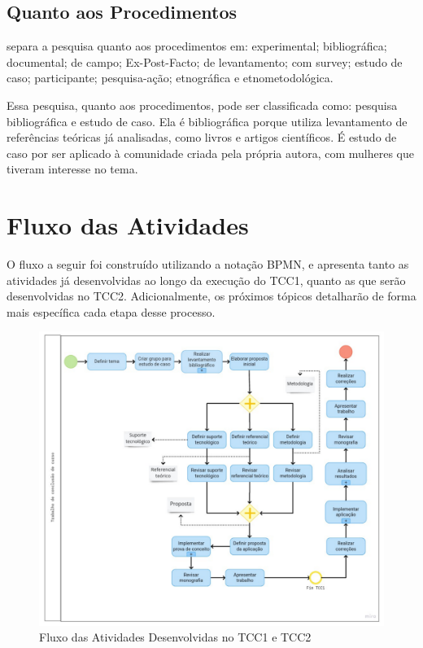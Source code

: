 \subsection{Quanto aos Procedimentos}

 separa a pesquisa quanto aos 
procedimentos em: experimental; bibliográfica; 
documental; de campo; Ex-Post-Facto; 
de levantamento; com survey; estudo de caso; 
participante; pesquisa-ação; etnográfica e etnometodológica.

Essa pesquisa, quanto aos procedimentos, pode ser classificada como: pesquisa bibliográfica e 
estudo de caso.
Ela é bibliográfica porque utiliza levantamento de referências teóricas já analisadas, 
como livros e artigos científicos. É estudo de caso por 
ser aplicado à comunidade criada pela própria autora, com 
mulheres que tiveram interesse no tema.


\section{Fluxo das Atividades}

O fluxo a seguir foi construído utilizando a notação BPMN, e apresenta 
tanto as atividades já desenvolvidas ao longo da execução do 
TCC1, quanto as que serão desenvolvidas no TCC2. 
Adicionalmente, os próximos tópicos detalharão de 
forma mais específica cada etapa desse processo.

\begin{figure}[h]
	\centering
	\includegraphics[keepaspectratio=true,scale=0.6]{figuras/fluxodeatividades.pdf}
	\caption{Fluxo das Atividades Desenvolvidas no TCC1 e TCC2}
        \label{fig03}
\end{figure}

